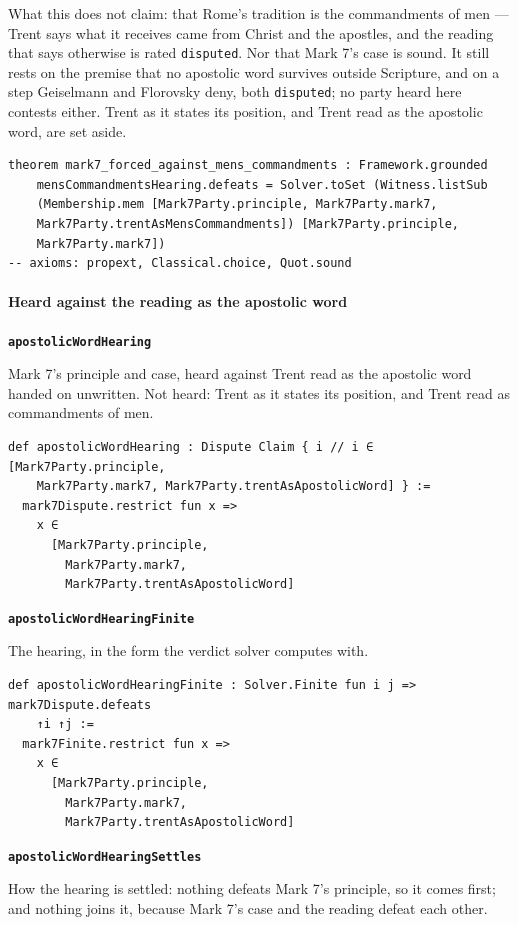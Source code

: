 \documentclass[11pt]{article}
\begin{document}
What this does not claim: that Rome's tradition is the commandments of men — Trent says what it receives came from Christ and the apostles, and the reading that says otherwise is rated \texttt{disputed}. Nor that Mark 7's case is sound. It still rests on the premise that no apostolic word survives outside Scripture, and on a step Geiselmann and Florovsky deny, both \texttt{disputed}; no party heard here contests either. Trent as it states its position, and Trent read as the apostolic word, are set aside.

{\small\begin{verbatim}
theorem mark7_forced_against_mens_commandments : Framework.grounded
    mensCommandmentsHearing.defeats = Solver.toSet (Witness.listSub
    (Membership.mem [Mark7Party.principle, Mark7Party.mark7,
    Mark7Party.trentAsMensCommandments]) [Mark7Party.principle,
    Mark7Party.mark7])
-- axioms: propext, Classical.choice, Quot.sound
\end{verbatim}}
\paragraph*{Heard against the reading as the apostolic word}
\leavevmode\par
\par\medskip\noindent\textbf{\texttt{apostolic\allowbreak{}Word\allowbreak{}Hearing}}\par\nobreak\noindent
Mark 7's principle and case, heard against Trent read as the apostolic word handed on unwritten. Not heard: Trent as it states its position, and Trent read as commandments of men.

{\small\begin{verbatim}
def apostolicWordHearing : Dispute Claim { i // i ∈ [Mark7Party.principle,
    Mark7Party.mark7, Mark7Party.trentAsApostolicWord] } :=
  mark7Dispute.restrict fun x =>
    x ∈
      [Mark7Party.principle,
        Mark7Party.mark7,
        Mark7Party.trentAsApostolicWord]
\end{verbatim}}
\par\medskip\noindent\textbf{\texttt{apostolic\allowbreak{}Word\allowbreak{}Hearing\allowbreak{}Finite}}\par\nobreak\noindent
The hearing, in the form the verdict solver computes with.

{\small\begin{verbatim}
def apostolicWordHearingFinite : Solver.Finite fun i j => mark7Dispute.defeats
    ↑i ↑j :=
  mark7Finite.restrict fun x =>
    x ∈
      [Mark7Party.principle,
        Mark7Party.mark7,
        Mark7Party.trentAsApostolicWord]
\end{verbatim}}
\par\medskip\noindent\textbf{\texttt{apostolic\allowbreak{}Word\allowbreak{}Hearing\allowbreak{}Settles}}\par\nobreak\noindent
How the hearing is settled: nothing defeats Mark 7's principle, so it comes first; and nothing joins it, because Mark 7's case and the reading defeat each other.
\end{document}
